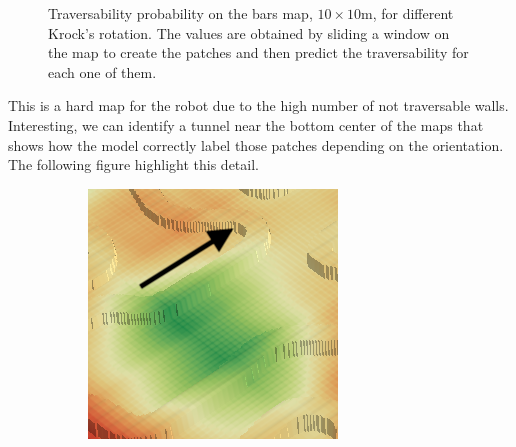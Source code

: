 \documentclass[../document.tex]{subfiles}
\begin{document}
\begin{figure} [htbp]
\begin{subfigure}[b]{0.45\textwidth}
  \end{subfigure}
  \caption{Traversability probability on the bars map, $10\times 10$m, for different Krock's rotation. The values are obtained by sliding a window on the map to create the patches and then predict the traversability for each one of them.}
  \end{figure}

This is a hard map for the robot due to the high number of not traversable walls. Interesting, we can identify a tunnel near the bottom center of the maps that shows how the model correctly label those patches depending on the orientation. The following figure highlight this detail.

\begin{figure} [htbp]
  \centering
  \begin{subfigure}[b]{0.23\textwidth}
    \includegraphics[width=\linewidth]{../img/4/traversability/bars/tunnel/-270-crop.png} 
  \end{subfigure}
  \begin{subfigure}[b]{0.23\textwidth}

\end{subfigure}
\end{figure}
\end{document}
